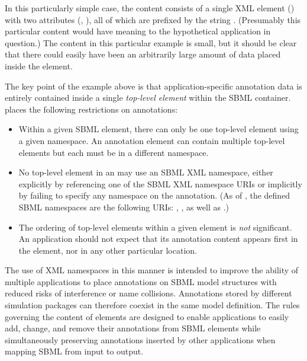 In this particularly simple case, the content consists of a single
XML element () with two attributes
(, ), all of which are prefixed by
the string .  (Presumably this particular content
would have meaning to the hypothetical application in question.)
The content in this particular example is small, but it should be
clear that there could easily have been an arbitrarily large
amount of data placed inside the  element.

The key point of the example above is that application-specific
annotation data is entirely contained inside a single
\emph{top-level element} within the SBML 
container.  \sbmltwotwo places the following restrictions on
annotations:
\begin{itemize}

\item Within a given SBML  element, there can
  only be one top-level element using a given namespace.  An
  annotation element can contain multiple top-level elements but
  each must be in a different namespace.

\item No top-level element in an  may use an
  SBML XML namespace, either explicitly by referencing one of the
  SBML XML namespace URIs or implicitly by failing to specify any
  namespace on the annotation.  (As of \sbmltwotwo, the defined
  SBML namespaces are the following URIs:
  ,
  , as well as
  .)

\item The ordering of top-level elements within a given
   element is \emph{not} significant.  An
  application should not expect that its annotation content
  appears first in the  element, nor in any
  other particular location.

\end{itemize}

The use of XML namespaces in this manner is intended to improve
the ability of multiple applications to place annotations on SBML
model structures with reduced risks of interference or name
collisions.  Annotations stored by different simulation packages
can therefore coexist in the same model definition.  The rules
governing the content of  elements are designed
to enable applications to easily add, change, and remove their
annotations from SBML elements while simultaneously preserving
annotations inserted by other applications when mapping SBML from
input to output.

